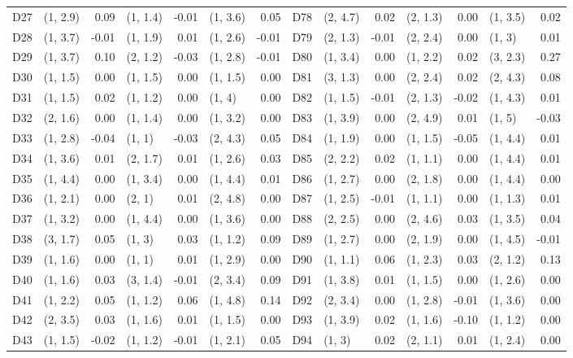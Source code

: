 \begin{table}[p]
\begin{tabular}{l|lr|lr|lr||l|lr|lr|lr}
D27 & (1, 2.9) & 0.09 & (1, 1.4) & -0.01 & (1, 3.6) & 0.05 & D78 & (2, 4.7) & 0.02 & (2, 1.3) & 0.00 & (1, 3.5) & 0.02 \\
D28 & (1, 3.7) & -0.01 & (1, 1.9) & 0.01 & (1, 2.6) & -0.01 & D79 & (2, 1.3) & -0.01 & (2, 2.4) & 0.00 & (1, 3) & 0.01 \\
D29 & (1, 3.7) & 0.10 & (2, 1.2) & -0.03 & (1, 2.8) & -0.01 & D80 & (1, 3.4) & 0.00 & (1, 2.2) & 0.02 & (3, 2.3) & 0.27 \\
D30 & (1, 1.5) & 0.00 & (1, 1.5) & 0.00 & (1, 1.5) & 0.00 & D81 & (3, 1.3) & 0.00 & (2, 2.4) & 0.02 & (2, 4.3) & 0.08 \\
D31 & (1, 1.5) & 0.02 & (1, 1.2) & 0.00 & (1, 4) & 0.00 & D82 & (1, 1.5) & -0.01 & (2, 1.3) & -0.02 & (1, 4.3) & 0.01 \\
D32 & (2, 1.6) & 0.00 & (1, 1.4) & 0.00 & (1, 3.2) & 0.00 & D83 & (1, 3.9) & 0.00 & (2, 4.9) & 0.01 & (1, 5) & -0.03 \\
D33 & (1, 2.8) & -0.04 & (1, 1) & -0.03 & (2, 4.3) & 0.05 & D84 & (1, 1.9) & 0.00 & (1, 1.5) & -0.05 & (1, 4.4) & 0.01 \\
D34 & (1, 3.6) & 0.01 & (2, 1.7) & 0.01 & (1, 2.6) & 0.03 & D85 & (2, 2.2) & 0.02 & (1, 1.1) & 0.00 & (1, 4.4) & 0.01 \\
D35 & (1, 4.4) & 0.00 & (1, 3.4) & 0.00 & (1, 4.4) & 0.01 & D86 & (1, 2.7) & 0.00 & (2, 1.8) & 0.00 & (1, 4.4) & 0.00 \\
D36 & (1, 2.1) & 0.00 & (2, 1) & 0.01 & (2, 4.8) & 0.00 & D87 & (1, 2.5) & -0.01 & (1, 1.1) & 0.00 & (1, 1.3) & 0.01 \\
D37 & (1, 3.2) & 0.00 & (1, 4.4) & 0.00 & (1, 3.6) & 0.00 & D88 & (2, 2.5) & 0.00 & (2, 4.6) & 0.03 & (1, 3.5) & 0.04 \\
D38 & (3, 1.7) & 0.05 & (1, 3) & 0.03 & (1, 1.2) & 0.09 & D89 & (1, 2.7) & 0.00 & (2, 1.9) & 0.00 & (1, 4.5) & -0.01 \\
D39 & (1, 1.6) & 0.00 & (1, 1) & 0.01 & (1, 2.9) & 0.00 & D90 & (1, 1.1) & 0.06 & (1, 2.3) & 0.03 & (2, 1.2) & 0.13 \\
D40 & (1, 1.6) & 0.03 & (3, 1.4) & -0.01 & (2, 3.4) & 0.09 & D91 & (1, 3.8) & 0.01 & (1, 1.5) & 0.00 & (1, 2.6) & 0.00 \\
D41 & (1, 2.2) & 0.05 & (1, 1.2) & 0.06 & (1, 4.8) & 0.14 & D92 & (2, 3.4) & 0.00 & (1, 2.8) & -0.01 & (1, 3.6) & 0.00 \\
D42 & (2, 3.5) & 0.03 & (1, 1.6) & 0.01 & (1, 1.5) & 0.00 & D93 & (1, 3.9) & 0.02 & (1, 1.6) & -0.10 & (1, 1.2) & 0.00 \\
D43 & (1, 1.5) & -0.02 & (1, 1.2) & -0.01 & (1, 2.1) & 0.05 & D94 & (1, 3) & 0.02 & (2, 1.1) & 0.01 & (1, 2.4) & 0.00 \\

\end{tabular}
\end{table}
